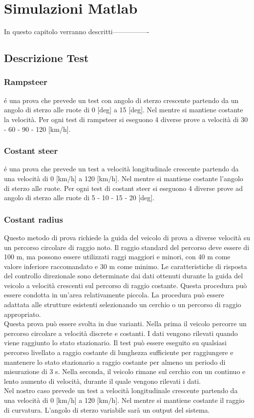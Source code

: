 \chapter{Simulazioni Matlab}
\label{cha:cap3}
In questo capitolo verranno descritti----------------


\section{Descrizione Test}

\subsection{Rampsteer}
é una prova che prevede un test con angolo di sterzo crescente partendo da un angolo di sterzo alle ruote di 0 [deg] a 15 [deg].
Nel mentre si mantiene costante la velocità.
Per ogni test di rampsteer si eseguono 4 diverse prove a velocità di 30 - 60 - 90 - 120 [km/h].

\subsection{Costant steer}
é una prova che prevede un test a velocità longitudinale crescente partendo da una velocità di 0 [km/h] a 120 [km/h].
Nel mentre si mantiene costante l'angolo di sterzo alle ruote.
Per ogni test di costant steer si eseguono 4 diverse prove ad angolo di sterzo alle ruote di 5 - 10 - 15 - 20 [deg].

\subsection{Costant radius}
Questo metodo di prova richiede la guida del veicolo di prova a diverse velocità su un percorso circolare di raggio noto. Il raggio standard del percorso deve essere di 100 m, ma possono essere utilizzati raggi maggiori e minori, con 40 m come valore inferiore raccomandato e 30 m come minimo.
Le caratteristiche di risposta del controllo direzionale sono determinate dai dati ottenuti durante la guida del veicolo a velocità crescenti sul percorso di raggio costante. Questa procedura può essere condotta in un'area relativamente piccola. La procedura può essere adattata alle strutture esistenti selezionando un cerchio o un percorso di raggio appropriato.
\\Questa prova può essere svolta in due varianti. Nella prima il veicolo percorre un percorso circolare a velocità discrete e costanti. I dati vengono rilevati quando viene raggiunto lo stato stazionario. Il test può essere eseguito su qualsiasi percorso livellato a raggio costante di lunghezza sufficiente per raggiungere e mantenere lo stato stazionario a raggio costante per almeno un periodo di misurazione di 3 s. Nella seconda, il veicolo rimane sul cerchio con un continuo e lento aumento di velocità, durante il quale vengono rilevati i dati.
\\Nel nostro caso prevede un test a velocità longitudinale crescente partendo da una velocità di 0 [km/h] a 120 [km/h].
Nel mentre si mantiene costante il raggio di curvatura.
L'angolo di sterzo variabile sarà un output del sistema.



